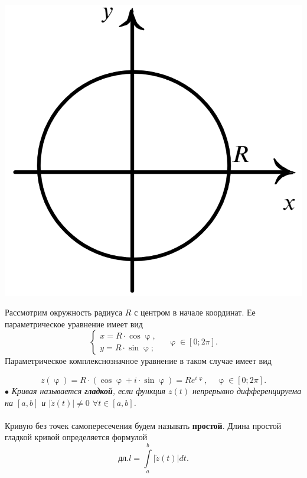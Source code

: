 \documentclass[a4paper, 12pt]{article}
\renewcommand{\varphi}{\upvarphi}
\newcommand\ef[1]{e^{i#1}}
\begin{document}
\noindent
\parbox[b][4.5cm][t]{50mm}{
	\includegraphics[scale=0.4]{images/018.png}}
	\hfill
	\parbox[b][4.5cm][t]{100mm}{
	Рассмотрим окружность радиуса $R$ с центром в начале координат. Ее параметрическое уравнение имеет вид $$\begin{cases}
	x = R\cdot \cos\varphi,\\
	y = R\cdot \sin\varphi;
\end{cases}\quad \varphi\in [0;2\pi].$$
Параметрическое комплекснозначное уравнение в таком случае имеет вид} $$z(\varphi) = R\cdot (\cos\varphi + i \cdot \sin\varphi) = R\ef{\varphi},\quad \varphi\in [0;2\pi].$$
$\bullet$ \textit{Кривая называется \textbf{гладкой}, если функция $z(t)$ непрерывно дифференцируема на $[a,b]$ и $|\dot{z}(t)|\ne 0$ $\forall t \in [a,b]$.}\\\\
Кривую без точек самопересечения будем называть \textbf{простой}. Длина простой гладкой кривой определяется формулой $$\text{дл.} l = \int\limits_a^b|\dot{z}(t)|dt.$$ 
\noindent
\end{document}
